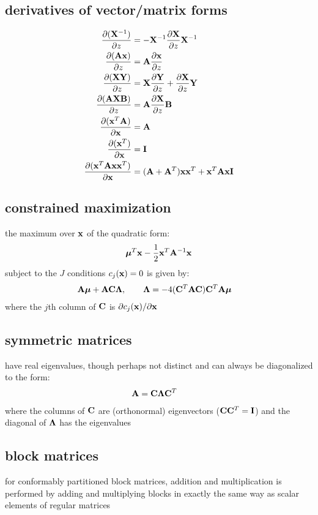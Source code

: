 \documentclass[12pt]{article}
\begin{document}
\subsection{derivatives of vector/matrix forms}
\begin{align}
\frac{\partial ({\mathbf X}^{-1})}{\partial z} &= -
{\mathbf X}^{-1}  \frac{\partial {\mathbf X}}{\partial z} {\mathbf X}^{-1} \\
\frac{\partial ({\mathbf A} {\mathbf x})}{\partial z} &= {\mathbf A}  
\frac{\partial {\mathbf x}}{\partial z}\\
\frac{\partial ({\mathbf X} {\mathbf Y})}{\partial z} &=
{\mathbf X}  \frac{\partial {\mathbf Y}}{\partial z} +
\frac{\partial {\mathbf X}}{\partial z} {\mathbf Y} \\ 
\frac{\partial ({\mathbf A} {\mathbf X} {\mathbf B})}{\partial z} &= {\mathbf A} 
\frac{\partial {\mathbf X}}{\partial z} {\mathbf B}\\  
\frac{\partial ({\mathbf x}^T{\mathbf A})}{\partial {\mathbf x}} &= {\mathbf A} \\ 
\frac{\partial ({\mathbf x}^T)}{\partial {\mathbf x}} &= {\mathbf I} \\
\frac{\partial ({\mathbf x}^T{\mathbf A}{\mathbf x}{\mathbf x}^T)}{\partial {\mathbf x}} &= 
({\mathbf A}+{\mathbf A}^T){\mathbf x}{\mathbf x}^T+{\mathbf x}^T{\mathbf A}{\mathbf x}{\mathbf I}
\end{align}

\subsection{constrained maximization}
the maximum over ${\mathbf x}$ of the quadratic form:
\begin{align}
{\boldsymbol \mu}^T{\mathbf x} - \frac{1}{2}{\mathbf x}^T{\mathbf A}^{-1}{\mathbf x}
\end{align}
subject to the $J$ conditions $c_j({\mathbf x})=0$  is given by:
\begin{align}
{\mathbf A}{\boldsymbol \mu} + {\mathbf A}{\mathbf C}{\boldsymbol \Lambda}, \qquad {\boldsymbol \Lambda} & = -4({\mathbf C}^T{\mathbf A}{\mathbf C}){\mathbf C}^T{\mathbf A}{\boldsymbol \mu}
\end{align}
where the $j$th column of ${\mathbf C}$ is $\partial c_j({\mathbf x}) / \partial {\mathbf x}$

\subsection{symmetric matrices}
have real eigenvalues, though perhaps not distinct and can always
be diagonalized to the form: 
\begin{align}
{\mathbf A} & = {\mathbf C} {\boldsymbol \Lambda} {\mathbf C}^T
\end{align}
where the columns of ${\mathbf C}$
are (orthonormal) eigenvectors (\ie ${\mathbf C} {\mathbf C}^T = {\mathbf I}$) and the
diagonal of ${\boldsymbol \Lambda}$ has the eigenvalues

\subsection{block matrices}
for conformably partitioned block matrices, addition and
multiplication is performed by adding and multiplying blocks in
exactly the same way as scalar elements of regular matrices
\end{document}
